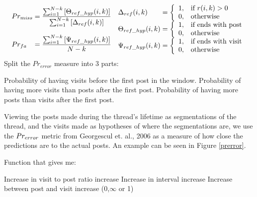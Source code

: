 \begin{align*}
	\begin{array}{l@{\mskip\thickmuskip}l}
	Pr_{miss} &=  \dfrac{%
		\sum^{N-k}_{i=1} \left[\Theta_{ref\_hyp} (i,k)\right]%
	}{%
		\sum^{N-k}_{i=1} \left[\Delta_{ref} (i,k)\right]%
	}\\
	 & \\
	Pr_{fa} &= \dfrac{%
		\sum^{N-k}_{i=1} \left[\Psi_{ref\_hyp} (i,k)\right]%
	}{N-k}
	\end{array}
	\begin{array}{l@{\mskip\thickmuskip}l}
		\Delta_{ref}(i,k) &= \left\{ \begin{array}{l l}
				1, & \text{if }r(i,k) > 0 \\
				0, & \text{otherwise} 
		\end{array} \right.\\
		\Theta_{ref\_hyp}(i,k) &= \left\{ \begin{array}{l l}
				1, & \text{if ends with post} \\
				0, & \text{otherwise} 
		\end{array} \right.\\
		\Psi_{ref\_hyp}(i,k) &= \left\{ \begin{array}{l l}
				1, & \text{if ends with visit}\\
				0, & \text{otherwise} 
		\end{array} \right.\\
	\end{array}
\end{align*}
Split the $Pr_{error}$ measure into 3 parts:

Probability of having visits before the first post in the window.
Probability of having more visits than posts after the first post.
Probability of having more posts than visits after the first post.



Viewing the posts made during the thread's lifetime as segmentations of the 
thread, and the visits made as hypotheses of where the segmentations are, we use 
the $Pr_{error}$ metric from Georgescul et. al., 2006 as a measure of how close 
the predictions are to the actual posts. An example can be seen in Figure 
\ref{prerror}.



Function that gives me:

Increase in visit to post ratio		increase
Increase in interval				increase
Increase between post and visit		increase
(0,$\infty$ or 1)

